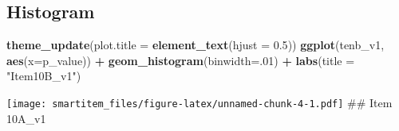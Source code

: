 \documentclass[]{book}
\newenvironment{Shaded}{\begin{snugshade}}{\end{snugshade}}
\newcommand{\KeywordTok}[1]{\textcolor[rgb]{0.13,0.29,0.53}{\textbf{#1}}}
\newcommand{\DataTypeTok}[1]{\textcolor[rgb]{0.13,0.29,0.53}{#1}}
\newcommand{\DecValTok}[1]{\textcolor[rgb]{0.00,0.00,0.81}{#1}}
\newcommand{\FloatTok}[1]{\textcolor[rgb]{0.00,0.00,0.81}{#1}}
\newcommand{\StringTok}[1]{\textcolor[rgb]{0.31,0.60,0.02}{#1}}
\newcommand{\OperatorTok}[1]{\textcolor[rgb]{0.81,0.36,0.00}{\textbf{#1}}}
\newcommand{\NormalTok}[1]{#1}
\theoremstyle{definition}
\theoremstyle{definition}
\theoremstyle{definition}
\theoremstyle{remark}
\begin{document}
\subsection{Histogram}\label{histogram}

\begin{Shaded}
\begin{Highlighting}[]
\KeywordTok{theme_update}\NormalTok{(}\DataTypeTok{plot.title =} \KeywordTok{element_text}\NormalTok{(}\DataTypeTok{hjust =} \FloatTok{0.5}\NormalTok{))}
\KeywordTok{ggplot}\NormalTok{(tenb_v1, }\KeywordTok{aes}\NormalTok{(}\DataTypeTok{x=}\NormalTok{p_value)) }\OperatorTok{+}\StringTok{ }\KeywordTok{geom_histogram}\NormalTok{(}\DataTypeTok{binwidth=}\NormalTok{.}\DecValTok{01}\NormalTok{) }\OperatorTok{+}\StringTok{ }\KeywordTok{labs}\NormalTok{(}\DataTypeTok{title =} \StringTok{"Item10B_v1"}\NormalTok{) }
\end{Highlighting}
\end{Shaded}

\texttt{[image: smartitem\_files/figure-latex/unnamed-chunk-4-1.pdf]}
\#\# Item 10A\_v1

\begin{Shaded}
\end{Shaded}
\end{document}
